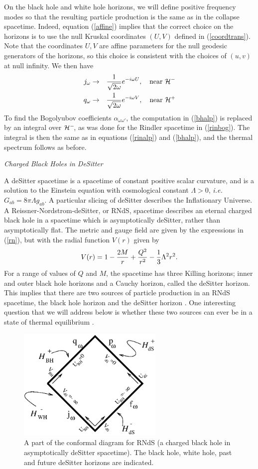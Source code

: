 \documentclass[12pt]{article}
\newcommand{\be}{\begin{equation}}
\newcommand{\ee}{\end{equation}}
\def\bena{\begin{eqnarray}}
\def\eena{\end{eqnarray}}
\def\fh{{\cal H}^+}
\def\ph{{\cal H}^-}
\def\q{q_{\omega}}
\def\j{j_{\omega}}
\def\alp{\alpha _{\omega \omega '}}
\begin{document}
On the black hole and white hole horizons, we will define positive
frequency modes so that the resulting particle production is the same as
in the collapse spacetime.  Indeed, equation (\ref{affine}) implies that
the correct
choice on the horizons is to use the null Kruskal coordinates $(U,V)$ defined
in (\ref{coordtrans}).  Note that the coordinates $U,V$ are affine
parameters for the null
geodesic generators of the horizons, so this choice is consistent with the
choices of $(u,v)$ at null infinity.  We then have
%
\bena\label{jpmodes} \j &\rightarrow &{1\over \sqrt{2\omega}}e^{-i\omega U},
\quad {\rm near} \  \ph \\
\q &\rightarrow &{1\over \sqrt{2\omega}}e^{-i\omega V}, \quad {\rm near} \
\fh \eena
%
To find the Bogolyubov coefficients $\alp$, the computation in
(\ref{bhalp})  is replaced by
an integral over $\ph\!$, as was done for the Rindler spacetime in
(\ref{rinbog}).
The integral is then the same as in equations (\ref{rinalp})  and
(\ref{bhalp}), and the thermal
spectrum follows as before.

\vskip 0.1in\noindent
{\it Charged Black Holes in DeSitter}
\vskip 0.05in

A deSitter spacetime is a spacetime of constant positive scalar curvature,
and is a solution to the Einstein equation with cosmological constant
$\Lambda >0$, {\it
i.e.} $G_{ab}=8\pi \Lambda g_{ab}$.  A particular slicing of deSitter
describes the
Inflationary Universe. A Reissner-Nordstrom-deSitter, or RNdS, spacetime
describes an eternal charged
black hole in a spacetime which is asymptotically deSitter, rather than
asymptotically flat.
The metric and gauge field are given by the expressions in (\ref{rn}), but
with the
radial function $V(r)$ given by
%
\be\label{rnds}
V(r)=1-{2M\over r} +{Q^2\over r^2} -{1\over 3}\Lambda ^2 r^2. \ee
%
For a range of values of $Q$ and $M$, the spacetime has three Killing horizons;
inner and outer black hole horizons and a Cauchy horizon, called the
deSitter horizon.
This implies that there are two sources of particle production in an RNdS
spacetime, the
black hole horizon and the deSitter horizon \cite{gh}.
One interesting question that we will address below is whether these two
sources can ever be
in a state of thermal equilibrium \cite{ktrnds}.
%
\begin{figure}[tb]
\begin{center}
\includegraphics[width=2.75in]{desitter.eps}
\end{center}
\caption{A part of the conformal diagram for RNdS (a charged black hole in
asymptotically
deSitter spacetime). The black hole, white hole, past and future deSitter
horizons
are indicated.}
\label{f5}
\end{figure}
%
\end{document}

